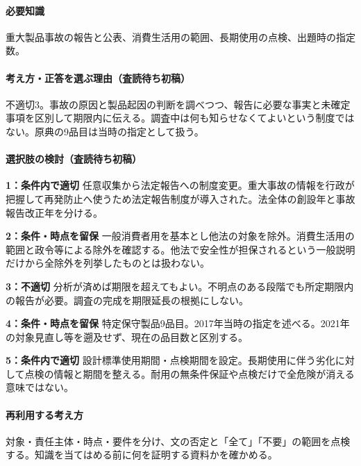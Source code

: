\paragraph{必要知識} 重大製品事故の報告と公表、消費生活用の範囲、長期使用の点検、出題時の指定数。

\paragraph{考え方・正答を選ぶ理由（査読待ち初稿）} 不適切3。事故の原因と製品起因の判断を調べつつ、報告に必要な事実と未確定事項を区別して期限内に伝える。調査中は何も知らせなくてよいという制度ではない。原典の9品目は当時の指定として扱う。

\paragraph{選択肢の検討（査読待ち初稿）}\mbox{}\par

\noindent\textbf{1：条件内で適切} 任意収集から法定報告への制度変更。重大事故の情報を行政が把握して再発防止へ使うため法定報告制度が導入された。法全体の創設年と事故報告改正年を分ける。\par

\noindent\textbf{2：条件・時点を留保} 一般消費者用を基本とし他法の対象を除外。消費生活用の範囲と政令等による除外を確認する。他法で安全性が担保されるという一般説明だけから全除外を列挙したものとは扱わない。\par

\noindent\textbf{3：不適切} 分析が済めば期限を超えてもよい。不明点のある段階でも所定期限内の報告が必要。調査の完成を期限延長の根拠にしない。\par

\noindent\textbf{4：条件・時点を留保} 特定保守製品9品目。2017年当時の指定を述べる。2021年の対象見直し等を遡及せず、現在の品目数と区別する。\par

\noindent\textbf{5：条件内で適切} 設計標準使用期間・点検期間を設定。長期使用に伴う劣化に対して点検の情報と期間を整える。耐用の無条件保証や点検だけで全危険が消える意味ではない。\par

\paragraph{再利用する考え方} 対象・責任主体・時点・要件を分け、文の否定と「全て」「不要」の範囲を点検する。知識を当てはめる前に何を証明する資料かを確かめる。

